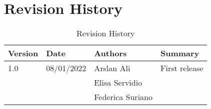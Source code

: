 \section{Revision History}
\begin{center}
\setlength\tabcolsep{7pt}
\renewcommand{\arraystretch}{1.5}
\begin{longtable}{|p{1.5cm}|p{1.7cm}|p{2.75cm}|p{2cm}|}
\caption{Revision History}\\
\hline
\endfirsthead
\endhead
\hline
\endlastfoot
\rowcolor{green2}
\textbf{Version} & \textbf{Date} & \textbf{Authors} & \textbf{Summary}\\
\hline
1.0 & 08/01/2022 & Arslan Ali &  First release\\
& & Elisa Servidio & \\
& & Federica Suriano &\\
\end{longtable}
\end{center}